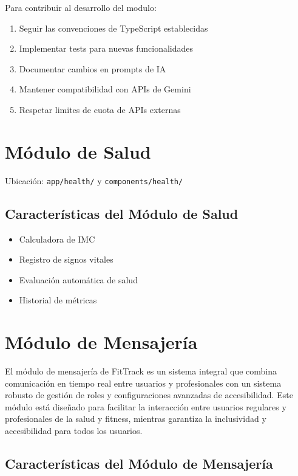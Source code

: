 \documentclass[12pt,a4paper]{article}
\begin{document}
Para contribuir al desarrollo del modulo:
\begin{enumerate}
    \item Seguir las convenciones de TypeScript establecidas
    \item Implementar tests para nuevas funcionalidades
    \item Documentar cambios en prompts de IA
    \item Mantener compatibilidad con APIs de Gemini
    \item Respetar limites de cuota de APIs externas
\end{enumerate}

\section{Módulo de Salud}

Ubicación: \texttt{app/health/} y \texttt{components/health/}

\subsection{Características del Módulo de Salud}
\begin{itemize}
    \item Calculadora de IMC
    \item Registro de signos vitales
    \item Evaluación automática de salud
    \item Historial de métricas
\end{itemize}

\section{Módulo de Mensajería}

El módulo de mensajería de FitTrack es un sistema integral que combina comunicación en tiempo real entre usuarios y profesionales con un sistema robusto de gestión de roles y configuraciones avanzadas de accesibilidad. Este módulo está diseñado para facilitar la interacción entre usuarios regulares y profesionales de la salud y fitness, mientras garantiza la inclusividad y accesibilidad para todos los usuarios.

\subsection{Características del Módulo de Mensajería}
\end{document}
